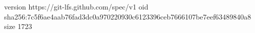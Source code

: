version https://git-lfs.github.com/spec/v1
oid sha256:7c5f6ae4aab76fad3dc0a970220930c6123396ceb7666107be7eef63489840a8
size 1723
